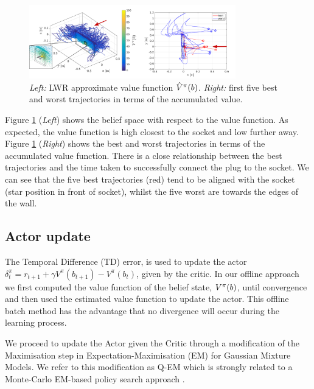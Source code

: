 \begin{figure}
 \centering
 \setlength\fboxsep{0pt}
  \setlength\fboxrule{0.25pt}
  \includegraphics[width=0.8\textwidth]{./ch4-PiH/Figures/Fig/Figure1.pdf}
 \caption{\textit{Left:} LWR approximate value function $\hat{V}^{\pi}(b)$. \textit{Right:} first five best and worst trajectories in terms of the accumulated value.}
  \label{fig:Figure1}
\end{figure}

Figure \ref{fig:Figure1} (\textit{Left}) shows the belief space with respect to the value function. As expected, the 
value function is high closest to the socket and low further away. Figure \ref{fig:Figure1}
(\textit{Right}) shows the best and worst trajectories in terms of the accumulated value function. There is a
close relationship between the best trajectories and the time taken to successfully connect the plug to the socket. We can see that the five best trajectories
(red) tend to be aligned with the socket (star position in front of socket), whilst the five worst are towards the edges
of the wall.

\subsection{Actor update}

The Temporal Difference (TD) error, is used to update the actor $\delta^{\pi}_t = r_{t+1} + \gamma V^{\pi}(b_{t+1}) - V^{\pi}(b_t)$, 
given by the critic\cite[Chap. 6]{sutton1998reinforcement}. 
In our offline approach we first computed the value function of the belief state, $V^{\pi}(b)$, 
until convergence and then used the estimated value function to update the actor. This offline batch 
method has the advantage that no divergence will occur during the learning process.

We proceed to update the Actor given the Critic through a modification of the Maximisation step in  Expectation-Maximisation (EM) 
for Gaussian Mixture Models. We refer to this modification as Q-EM which is strongly related to a Monte-Carlo EM-based policy 
search approach \cite[p.50]{DeisenrothNP2013}. 

